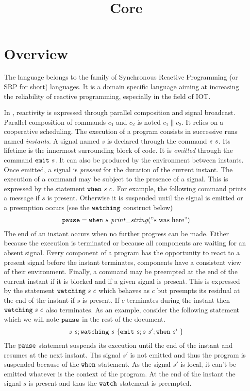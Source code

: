 \documentclass[12pt]{article}
\title{Core \sail}
\begin{document}
\maketitle
\section{Overview}
The \sail{} language belongs to the family of Synchronous Reactive Programming
(or SRP for short) languages. It is a domain specific language aiming at increasing the
reliability of reactive programming, especially in the field of IOT.

In \sail{}, reactivity is expressed through parallel composition and signal broadcast. Parallel composition of commands
$c_1$ and $c_2$ is noted $c_1 \parallel c_2$. It relies on a cooperative scheduling.
The execution of a program consists in successive runs named {\emph{instants}}.
A signal named $s$ is declared through the command $s~s$. Its lifetime is the innermost surrounding block of code.
It is {\emph{emitted}} through the command ${\tt{emit}}~s$. It can also be produced by the environment
between instants. Once emitted, a signal is {\emph{present}} for the duration of the current instant.
The execution of a command may be subject to the presence of a signal.
This is expressed by the statement ${\tt{when}}~s~c$.
For example, the following command prints a message if $s$ is present. Otherwise it is suspended
until the signal is emitted or a preemption occurs (see the ${\tt{watching}}$ construct below)
$$
  \begin{array}{l}
    {\tt{pause}} = {\tt{when}}~s~{\mathit{print\_string}}("{\text{s was here}}")
  \end{array}
$$
The end of an instant occurs when  no further progress can be made. Either because the execution
is terminated or because all components are waiting for an absent signal.
Every component of a program has the opportunity to react to a present signal before the instant
terminates, components have a consistent view of their environment.
Finally, a command may be preempted at the end of the current instant if it is blocked and if a given signal is present.
This is expressed by the statement ${\tt{watching}}~s~c$ which behaves as $c$ but preempts its residual at the end
of the instant if $s$ is present. If $c$ terminates during the instant then ${\tt{watching}}~s~c$ also terminates.
As an example, consider the following statement which we will note ${\tt{pause}}$ in the rest of the document.
$$
  \begin{array}{c}
    s~s; {\tt{watching}}~s~\{{\tt{emit}}~s;s~s';{\tt{when}}~s'~\}
  \end{array}
$$
The ${\tt{pause}}$ statement suspends its execution until the end of the instant and resumes at the next instant.
Ths signal $s'$ is not emitted and thus the program is suspended because of the ${\tt{when}}$ statement. As the signal $s'$ is
local, it can't be emitted whatever is the context of the program. At the end of
the instant the signal $s$ is present and thus the ${\tt{watch}}$ statement is preempted.
\end{document}
